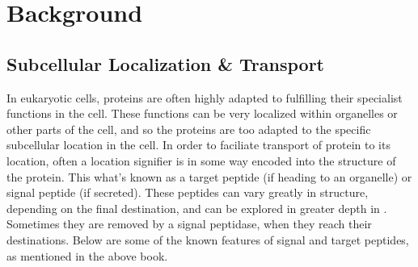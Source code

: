 \documentclass{bioinfo}
\begin{document}




\section{Background}

\subsection{Subcellular Localization \& Transport}

In eukaryotic cells, proteins are often highly adapted to fulfilling their specialist functions in the cell.
These functions can be very localized within organelles or other parts of the cell, and so the proteins are too adapted to the specific subcellular location in the cell. 
In order to faciliate transport of protein to its location, often a location signifier is in some way encoded into the structure of the protein.
This what's known as a target peptide (if heading to an organelle) or signal peptide (if secreted). 
These peptides can vary greatly in structure, depending on the final destination, and can be explored in greater depth in \cite{Alb00}. 
Sometimes they are removed by a signal peptidase, when they reach their destinations.
Below are some of the known features of signal and target peptides, as mentioned in the above book.
\end{document}
